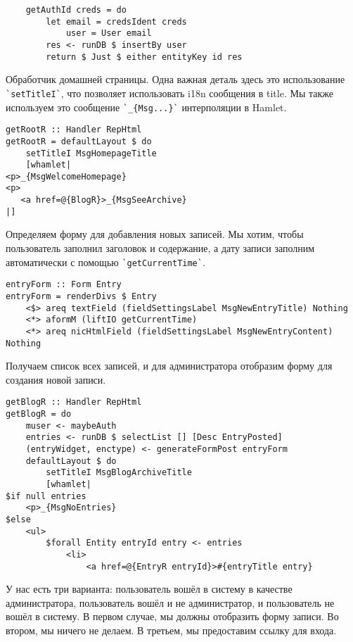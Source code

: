 \begin{lstlisting}
    getAuthId creds = do
        let email = credsIdent creds
            user = User email
        res <- runDB $ insertBy user
        return $ Just $ either entityKey id res
\end{lstlisting}
 
Обработчик домашней страницы. Одна важная деталь здесь это использование \lstinline'`setTitleI`', что позволяет использовать i18n сообщения в title. Мы также используем это сообщение \lstinline'`_{Msg...}`' интерполяции в Hamlet. 
 
\begin{lstlisting}
getRootR :: Handler RepHtml
getRootR = defaultLayout $ do
    setTitleI MsgHomepageTitle
    [whamlet|
<p>_{MsgWelcomeHomepage}
<p>
   <a href=@{BlogR}>_{MsgSeeArchive}
|]
\end{lstlisting}
 
Определяем форму для добавления новых записей. Мы хотим, чтобы пользователь заполнил заголовок и содержание, а дату записи заполним автоматически с помощью \lstinline'`getCurrentTime`'. 
 
\begin{lstlisting}
entryForm :: Form Entry
entryForm = renderDivs $ Entry
    <$> areq textField (fieldSettingsLabel MsgNewEntryTitle) Nothing
    <*> aformM (liftIO getCurrentTime)
    <*> areq nicHtmlField (fieldSettingsLabel MsgNewEntryContent) Nothing
\end{lstlisting}
 
Получаем список всех записей, и для администратора отобразим форму для создания новой записи. 
 
\begin{lstlisting}
getBlogR :: Handler RepHtml
getBlogR = do
    muser <- maybeAuth
    entries <- runDB $ selectList [] [Desc EntryPosted]
    (entryWidget, enctype) <- generateFormPost entryForm
    defaultLayout $ do
        setTitleI MsgBlogArchiveTitle
        [whamlet|
$if null entries
    <p>_{MsgNoEntries}
$else
    <ul>
        $forall Entity entryId entry <- entries
            <li>
                <a href=@{EntryR entryId}>#{entryTitle entry}
\end{lstlisting}
 
У нас есть три варианта: пользователь вошёл в систему в качестве администратора, пользователь вошёл и не администратор, и пользователь не вошёл в систему. В первом случае, мы должны отобразить форму записи. Во втором, мы ничего не делаем. В третьем, мы предоставим ссылку для входа. 
 
